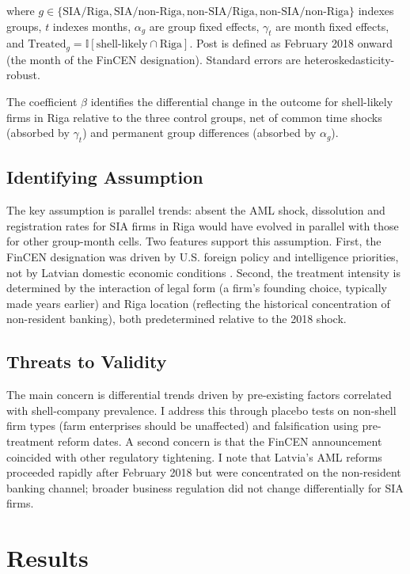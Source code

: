 \documentclass[12pt]{article}
\newcommand{\ind}{\mathbb{I}}
\begin{document}
\noindent where $g \in \{\text{SIA/Riga}, \text{SIA/non-Riga}, \text{non-SIA/Riga}, \text{non-SIA/non-Riga}\}$ indexes groups, $t$ indexes months, $\alpha_g$ are group fixed effects, $\gamma_t$ are month fixed effects, and $\text{Treated}_g = \ind[\text{shell-likely} \cap \text{Riga}]$. Post is defined as February 2018 onward (the month of the FinCEN designation). Standard errors are heteroskedasticity-robust.

The coefficient $\beta$ identifies the differential change in the outcome for shell-likely firms in Riga relative to the three control groups, net of common time shocks (absorbed by $\gamma_t$) and permanent group differences (absorbed by $\alpha_g$).

\subsection{Identifying Assumption}

The key assumption is parallel trends: absent the AML shock, dissolution and registration rates for SIA firms in Riga would have evolved in parallel with those for other group-month cells. Two features support this assumption. First, the FinCEN designation was driven by U.S. foreign policy and intelligence priorities, not by Latvian domestic economic conditions \citep{FinCEN2018}. Second, the treatment intensity is determined by the interaction of legal form (a firm's founding choice, typically made years earlier) and Riga location (reflecting the historical concentration of non-resident banking), both predetermined relative to the 2018 shock.

\subsection{Threats to Validity}

The main concern is differential trends driven by pre-existing factors correlated with shell-company prevalence. I address this through placebo tests on non-shell firm types (farm enterprises should be unaffected) and falsification using pre-treatment reform dates. A second concern is that the FinCEN announcement coincided with other regulatory tightening. I note that Latvia's AML reforms proceeded rapidly after February 2018 but were concentrated on the non-resident banking channel; broader business regulation did not change differentially for SIA firms.

\section{Results}
\label{sec:results}
\end{document}
